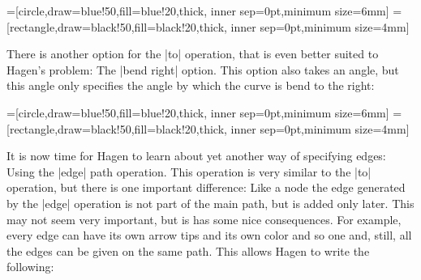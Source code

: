 {
=[circle,draw=blue!50,fill=blue!20,thick,
                   inner sep=0pt,minimum size=6mm]
=[rectangle,draw=black!50,fill=black!20,thick,
                        inner sep=0pt,minimum size=4mm]
\begin{codeexample}[]
\end{codeexample}
}

There is another option for the |to| operation, that is even better
suited to Hagen's problem: The |bend right| option. This option also
takes an angle, but this angle only specifies the angle by which the
curve is bend to the right:

{
=[circle,draw=blue!50,fill=blue!20,thick,
                   inner sep=0pt,minimum size=6mm]
=[rectangle,draw=black!50,fill=black!20,thick,
                        inner sep=0pt,minimum size=4mm]
\begin{codeexample}[]
\end{codeexample}
}

It is now time for Hagen to learn about yet another way of specifying
edges: Using the |edge| path operation. This operation is very similar
to the |to| operation, but there is one important difference: Like a
node the edge generated by the |edge| operation is not part of the
main path, but is added only later. This may not seem very important,
but is has some nice consequences. For example, every edge can have
its own arrow tips and its own color and so one and, still, all the
edges can be given on the same path. This allows Hagen to write the
following: 


